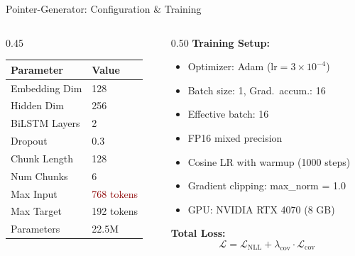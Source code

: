 \documentclass[10pt, aspectratio=169]{beamer}
\begin{document}
\begin{frame}{Pointer-Generator: Configuration \& Training}
  \begin{columns}[T]
    \begin{column}{0.45\textwidth}
      \begin{table}
        \centering
        \small
        \begin{tabular}{ll}
          \toprule
          \textbf{Parameter} & \textbf{Value} \\
          \midrule
          Embedding Dim & 128 \\
          Hidden Dim & 256 \\
          BiLSTM Layers & 2 \\
          Dropout & 0.3 \\
          Chunk Length & 128 \\
          Num Chunks & 6 \\
          Max Input & \textcolor{darkred}{768 tokens} \\
          Max Target & 192 tokens \\
          Parameters & 22.5M \\
          \bottomrule
        \end{tabular}
      \end{table}
    \end{column}
    \begin{column}{0.50\textwidth}
      \textbf{Training Setup:}
      \begin{itemize}
        \item Optimizer: Adam ($\text{lr}=3\times10^{-4}$)
        \item Batch size: 1, Grad.\ accum.: 16
        \item Effective batch: 16
        \item FP16 mixed precision
        \item Cosine LR with warmup (1000 steps)
        \item Gradient clipping: max\_norm = 1.0
        \item GPU: NVIDIA RTX 4070 (8 GB)
      \end{itemize}

      \vspace{0.3cm}
      \textbf{Total Loss:}
      \begin{equation}
        \mathcal{L} = \mathcal{L}_{\text{NLL}} + \lambda_{\text{cov}} \cdot \mathcal{L}_{\text{cov}} \nonumber
      \end{equation}
    \end{column}
  \end{columns}
\end{frame}
\end{document}

